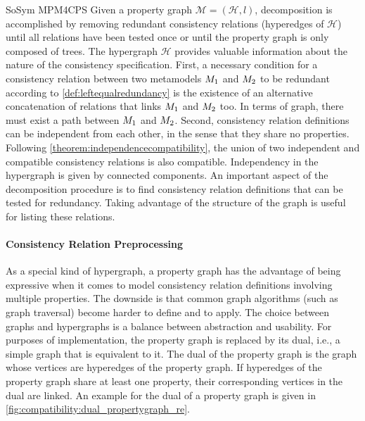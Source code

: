 \begin{copiedFrom}{SoSym MPM4CPS}
Given a property graph $\mathcal{M} = (\mathcal{H}, l)$, decomposition is accomplished by removing redundant consistency relations (hyperedges of $\mathcal{H}$) until all relations have been tested once or until the property graph is only composed of trees.
The hypergraph $\mathcal{H}$ provides valuable information about the nature of the consistency specification. First, a necessary condition for a consistency relation between two metamodels $M_{1}$ and $M_{2}$ to be redundant according to \autoref{def:leftequalredundancy} is the existence of an alternative concatenation of relations that links $M_{1}$ and $M_{2}$ too. In terms of graph, there must exist a path between $M_{1}$ and $M_{2}$. Second, consistency relation definitions can be independent from each other, in the sense that they share no properties. Following \autoref{theorem:independencecompatibility}, the union of two independent and compatible consistency relations is also compatible. Independency in the hypergraph is given by connected components. An important aspect of the decomposition procedure is to find consistency relation definitions that can be tested for redundancy. Taking advantage of the structure of the graph is useful for listing these relations.

\paragraph{Consistency Relation Preprocessing}
As a special kind of hypergraph, a property graph has the advantage of being expressive when it comes to model consistency relation definitions involving multiple properties. The downside is that common graph algorithms (such as graph traversal) become harder to define and to apply. The choice between graphs and hypergraphs is a balance between abstraction and usability. 
For purposes of implementation, the property graph is replaced by its dual, i.e., a simple graph that is equivalent to it. The dual of the property graph is the graph whose vertices are hyperedges of the property graph. If hyperedges of the property graph share at least one property, their corresponding vertices in the dual are linked. An example for the dual of a property graph is given in \autoref{fig:compatibility:dual_propertygraph_re}.




\end{copiedFrom}
